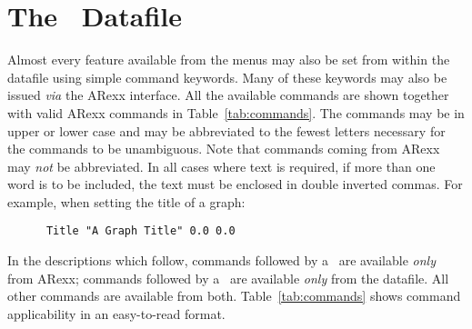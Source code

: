 \chapter{The \amplot\ Datafile}
\label{ch:datafile}
Almost every feature available from the menus may also be set from within 
the datafile using simple command keywords. Many of these keywords may also be issued 
{\em via\/} the ARexx interface. All the available commands are shown 
together with valid ARexx commands in Table~\ref{tab:commands}. 
The commands may be in upper or lower case and may be abbreviated to the 
fewest letters necessary for the commands to be unambiguous. Note that 
commands coming from ARexx may {\em not\/} be abbreviated. In all cases 
where text is required, if more than one word is to be included,
the text must be enclosed in double inverted commas. For example, when 
setting the title of a graph:
\begin{verbatim}
      Title "A Graph Title" 0.0 0.0
\end{verbatim}

In the descriptions which follow, commands followed by a \dag\ are available {\em 
only\/} from ARexx; commands followed by a \ddag\ are available {\em only\/} from 
the datafile. All other commands are available from both. Table~\ref{tab:commands} 
shows command applicability in an easy-to-read format.

